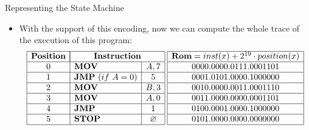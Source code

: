 \begin{frame}[allowframebreaks]{Representing the State Machine}
\begin{itemize}
\item With the support of this encoding, now we can compute the whole trace of the execution of this program:
\[
\begin{array}{|c|l|c|c|}
\hline
\mathbf{Position} & \multicolumn{2}{|c|}{\mathbf{Instruction}} \\ \hline
0 & \mathbf{MOV} & A, 7 \\ \hline
1 & \mathbf{JMP}~(if~A = 0) & 5 \\ \hline
2 & \mathbf{MOV} & B, 3 \\ \hline
3 & \mathbf{MOV} & A, 0 \\ \hline
4 & \mathbf{JMP} & 1 \\ \hline
5 & \mathbf{STOP} & \emptyset \\ \hline
\end{array}
\hspace{0.1cm}
\begin{array}{|c|c|}
\hline
\mathbf{Rom} = inst(x) + 2^{19} \cdot position(x) \\ \hline
0000.0000.0111.0001101 \\ \hline
0001.0101.0000.1000000 \\ \hline
0010.0000.0011.0001110 \\ \hline
0011.0000.0000.0001101 \\ \hline
0100.0001.0000.1000000 \\ \hline
0101.0000.0000.0000000 \\ \hline
\end{array}
\]


\end{itemize}
\end{frame}
